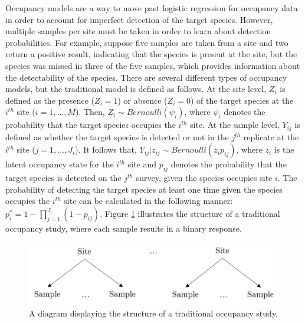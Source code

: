 \documentclass[12pt]{article}\usepackage[]{graphicx}\usepackage[]{color}
\begin{document}
Occupancy models are a way to move past logistic regression for occupancy data in order to account for imperfect detection of the target species. However, multiple samples per site must be taken in order to learn about detection probabilities. For example, suppose five samples are taken from a site and two return a positive result, indicating that the species is present at the site, but the species was missed in three of the five samples, which provides information about the detectability of the species. There are several different types of occupancy models, but the traditional model is defined as follows. At the site level, $Z_i$ is defined as the presence ($Z_i = 1$) or absence ($Z_i = 0$) of the target species at the $i^{th}$ site ($i = 1, \dots, M$). Then, $Z_i \sim Bernoulli(\psi_i)$, where $\psi_i$ denotes the probability that the target species occupies the $i^{th}$ site. At the sample level, $Y_{ij}$ is defined as whether the target species is detected or not in the $j^{th}$ replicate at the $i^{th}$ site ($j = 1, \dots, J_{i}$). It follows that, $Y_{ij}|z_{ij} \sim Bernoulli(z_{i}p_{ij})$, where $z_i$ is the latent occupancy state for the $i^{th}$ site and $p_{ij}$ denotes the probability that the target species is detected on the $j^{th}$ survey, given the species occupies site $i$. The probability of detecting the target species at least one time given the species occupies the $i^{th}$ site can be calculated in the following manner: $p_i^* = 1 - \prod_{j = 1}^{J_i}(1 - p_{ij})$. Figure \ref{fig:ssocc} illustrates the structure of a traditional occupancy study, where each sample results in a binary response. 

\begin{figure}[]
	\centering
	\includegraphics[scale = 0.7]{images/ssocc}
	\caption{A diagram displaying the structure of a traditional occupancy study.}
	\label{fig:ssocc}
\end{figure}
\end{document}

